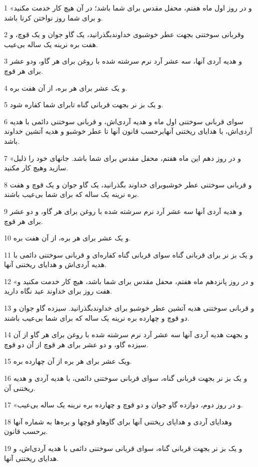 \par 1 «و در روز اول ماه هفتم، محفل مقدس برای شما باشد؛ در آن هیچ کار خدمت مکنید و برای شما روز نواختن کرنا باشد.
\par 2 وقربانی سوختنی بجهت عطر خوشبوی خداوندبگذرانید، یک گاو جوان و یک قوچ، و هفت بره نرینه یک ساله بی‌عیب.
\par 3 و هدیه آردی آنها، سه عشر آرد نرم سرشته شده با روغن برای هر گاو، ودو عشر برای هر قوچ.
\par 4 و یک عشر برای هر بره، از آن هفت بره.
\par 5 و یک بز نر بجهت قربانی گناه تابرای شما کفاره شود.
\par 6 سوای قربانی سوختنی اول ماه و هدیه آردی‌اش، و قربانی سوختنی دائمی با هدیه آردی‌اش، با هدایای ریختنی آنهابرحسب قانون آنها تا عطر خوشبو و هدیه آتشین خداوند باشد.
\par 7 «و در روز دهم این ماه هفتم، محفل مقدس برای شما باشد. جانهای خود را ذلیل سازید وهیچ کار مکنید.
\par 8 و قربانی سوختنی عطر خوشبوبرای خداوند بگذرانید، یک گاو جوان و یک قوچ و هفت بره نرینه یک ساله که برای شما بی‌عیب باشند.
\par 9 و هدیه آردی آنها سه عشر آرد نرم سرشته شده با روغن برای هر گاو، و دو عشر برای هر قوچ.
\par 10 و یک عشر برای هر بره، از آن هفت بره.
\par 11 و یک بز نر برای قربانی گناه سوای قربانی گناه کفاره‌ای و قربانی سوختنی دائمی با هدیه آردی‌اش و هدایای ریختنی آنها.
\par 12 «و در روز پانزدهم ماه هفتم، محفل مقدس برای شما باشد، هیچ کار خدمت مکنید و هفت روز برای خداوند عید نگاه دارید.
\par 13 و قربانی سوختنی هدیه آتشین عطر خوشبو برای خداوندبگذرانید. سیزده گاو جوان و دو قوچ و چهارده بره نرینه یک ساله که برای شما بی‌عیب باشند.
\par 14 و بجهت هدیه آردی آنها سه عشر آرد نرم سرشته شده با روغن برای هر گاو از آن سیزده گاو، و دو عشر برای هر قوچ از آن دو قوچ.
\par 15 ویک عشر برای هر بره از آن چهارده بره.
\par 16 و یک بز نر بجهت قربانی گناه، سوای قربانی سوختنی دائمی، با هدیه آردی و هدیه ریختنی آن.
\par 17 «و در روز دوم، دوازده گاو جوان و دو قوچ و چهارده بره نرینه یک ساله بی‌عیب.
\par 18 وهدایای آردی و هدایای ریختنی آنها برای گاوهاو قوچها و بره‌ها به شماره آنها برحسب قانون.
\par 19 و یک بز نر بجهت قربانی گناه، سوای قربانی سوختنی دائمی با هدیه آردی‌اش، و هدایای ریختنی آنها.
